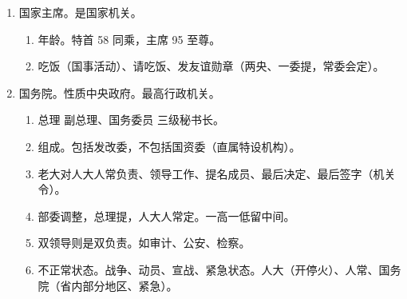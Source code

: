 \begin{enumerate}
\begin{enumerate}
\begin{enumerate}
\begin{enumerate}
                          \item 个人提案。30 个代表  个代表团。30、1。
                        \end{enumerate}
                  \item 质询案。只可能个人提。谴责意味很强。30、1。
                  \item 罢免案。1/10 代表、3 个代表团、主席团。10、3、团。
                \end{enumerate}
          \item 人常。没有一团。
                \begin{enumerate}
                  \item 机关提案 = 两央、两高、三委（委员长、专委、国监委）。
                  \item 个人提案。1/10 委员长会议、委员。10。
                  \item 质询案。10。
                  \item 撤职案。撤职对象只针对两央，不包括两院、一委。首长、委员长会议能提。过半。
                \end{enumerate}
          \item 是否列入议程。个人可列可不列，管事的人决定。人大 \yjt 主席团。人常 \yjt 委员长会议。
          \item 公布。宪法以外，基本都是找国家主席发主席令。
        \end{enumerate}
  \item 国家主席。是国家机关。
        \begin{enumerate}
          \item 年龄。特首 58 同乘，主席 95 至尊。
          \item 吃饭（国事活动）、请吃饭、发友谊勋章（两央、一委提，常委会定）。
        \end{enumerate}
  \item 国务院。性质中央政府。最高行政机关。
        \begin{enumerate}
          \item 总理 \yjt 副总理、国务委员 \yjt 三级秘书长。
          \item 组成。包括发改委，不包括国资委（直属特设机构）。
          \item 老大对人大人常负责、领导工作、提名成员、最后决定、最后签字（机关令）。
          \item 部委调整，总理提，人大人常定。一高一低留中间。
          \item 双领导则是双负责。如审计、公安、检察。
          \item 不正常状态。战争、动员、宣战、紧急状态。人大（开停火）、人常、国务院（省内部分地区、紧急）。

\end{enumerate}
\end{enumerate}
